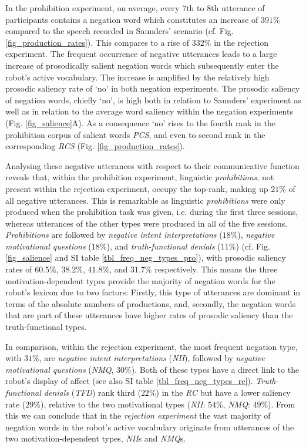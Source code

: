 In the prohibition experiment, on average, every 7th to 8th utterance of participants contains a negation word which constitutes an increase of $391\%$ compared to
the speech recorded in Saunders' scenario (cf. Fig. \ref{fig_production_rates}). This compares to a rise of $332\%$ in the rejection experiment. The frequent occurrence
of negative utterances leads to a large increase of prosodically salient negation words which subsequently enter the robot's active vocabulary. The increase is amplified
by the relatively high prosodic saliency rate of `no' in both negation experiments. The prosodic saliency of negation words, chiefly `no', is high both in relation
to Saunders' experiment as well as in relation to the average word saliency within the negation experiments (Fig. \ref{fig_salience}A).
As a consequence `no' rises to the fourth rank in the prohibition corpus of salient words \emph{PCS},  and even to second rank in the corresponding \emph{RCS}
(Fig. \ref{fig_production_rates}).

Analysing these negative utterances with respect to their communicative function reveals that, within the prohibition experiment, linguistic \emph{prohibitions},
not present within the rejection experiment, occupy the top-rank, making up $21\%$ of all negative utterances. This is remarkable as linguistic \emph{prohibitions}
were only produced when the prohibition task was given, i.e. during the first three sessions, whereas utterances of the other types were produced in all of the five
sessions. \emph{Prohibitions} are followed by \emph{negative intent interpretations} ($18\%$), \emph{negative motivational questions} ($18\%$), and
\emph{truth-functional denials} ($11\%$) (cf. Fig. \ref{fig_salience} and SI table \ref{tbl_freq_neg_types_pro}), with prosodic saliency rates of $60.5\%$, $38.2\%$, 
$41.8\%$, and $31.7\%$ respectively. This means the three motivation-dependent types provide the majority of negation words for the robot's lexicon due to two factors:
Firstly, this type of utterances are dominant in terms of the absolute numbers of productions, and, secondly, the negation words that are part of these utterances
have higher rates of prosodic saliency than the truth-functional types.

In comparison, within the rejection experiment, the most frequent negation type, with $31\%$, are \emph{negative intent interpretations} (\emph{NII}), followed by 
\emph{negative motivational questions} (\emph{NMQ}, $30\%$). Both of these types have a direct link to the robot's display of affect (see also SI table
\ref{tbl_freq_neg_types_re}). \emph{Truth-functional denials} (\emph{TFD}) rank third ($22\%$) in the \emph{RC} but have a lower
saliency rate ($29\%$), relative to the two motivational types (\emph{NII}: $54\%$, \emph{NMQ}: $49\%$). From this we can conclude that in the \emph{rejection experiment} 
the vast majority of negation words in the robot's active vocabulary originate from utterances of the two motivation-dependent types, \emph{NII}s and \emph{NMQ}s.

